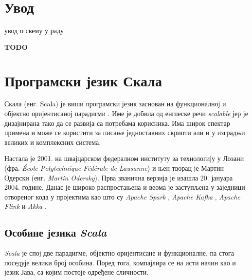 \documentclass[12pt,oneside]{memoir}
\begin{document}
\frontmatter
\naslovna
\komisija
\apstrakt
\tableofcontents*

\mainmatter


\chapter{Увод}
\label{chp:uvod}

увод о свему у раду

\textbf{TODO}

\chapter{Програмски језик Скала}
\label{chp:scala}

Скала (енг. Scala) је виши програмски језик заснован на функционалној и објектно оријентисаној парадигми  \cite{scala_prog}. Име је добила од енглеске речи \textit{scalable} јер је дизајнирана тако да се развија са потребама корисника. Има широк спектар примена и може се користити за писање једноставних скрипти али и у изградњи великих и комплексних система.

Настала је 2001. на швајцарском федералном институту за технологију у Лозани (фра. \textit{École Polytechnique Fédérale de Lausanne}) и њен творац је Мартин Одерски (енг. \textit{Martin Odersky}). Прва званична верзија је изашла 20. јануара 2004. године. Данас је широко распростањена и веома је заступљена у заједници отвореног кода у пројектима као што су \textit{Apache Spark} \cite{apache_spark}, \textit{Apache Kafka} \cite{apache_kafka}, \textit{Apache Flink} \cite{apache_flink} и \textit{Akka} \cite{scala_akka}.

\section{Особине језика \textit{Scala}}
\label{sec:osоб_scala}

\textit{Scala} је спој две парадигме, објектно оријентисане и функционалне, па стога поседује велики број особина. Поред тога, компајлира се на исти начин као и језик Јава, са којим постоје одређене сличности. \
\end{document}
